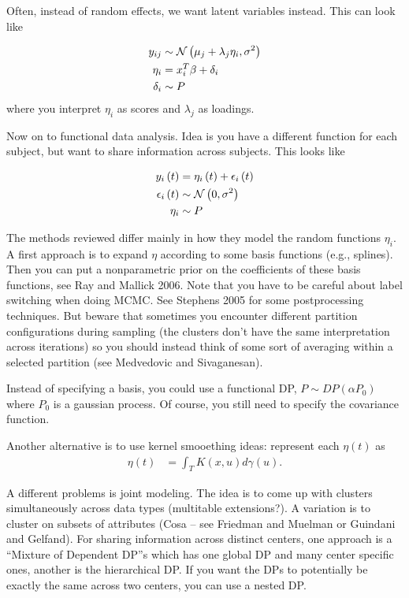 \documentclass{article}
\begin{document}
Often, instead of random effects, we want latent variables instead. This can
look like

\begin{align}
  y_{ij} &\sim \mathcal{N}\left(\mu_{j} + \lambda_{j} \eta_{i}, \sigma^{2}\right) \\
  \eta_{i} &= x_{i}^{T}\beta + \delta_{i} \\
  \delta_{i} &\sim P
\end{align}
where you interpret $\eta_{i}$ as scores and $\lambda_{j}$ as loadings.

Now on to functional data analysis. Idea is you have a different function for
each subject, but want to share information across subjects. This looks like

\begin{align}
  y_{i}\left(t\right) &= \eta_{i}\left(t\right) + \epsilon_{i}\left(t\right) \\
  \epsilon_{i}\left(t\right) &\sim \mathcal{N}\left(0, \sigma^{2}\right) \\
  \eta_{i} &\sim P
\end{align}

The methods reviewed differ mainly in how they model the random functions
$\eta_{i}$. A first approach is to expand $\eta$ according to some basis
functions (e.g., splines). Then you can put a nonparametric prior on the
coefficients of these basis functions, see Ray and Mallick 2006. Note that you
have to be careful about label switching when doing MCMC. See Stephens 2005 for
some postprocessing techniques. But beware that sometimes you encounter
different partition configurations during sampling (the clusters don't have the
same interpretation across iterations) so you should instead think of some sort
of averaging within a selected partition (see Medvedovic and Sivaganesan).

Instead of specifying a basis, you could use a functional DP,
$P \sim DP\left(\alpha P_{0}\right)$ where $P_{0}$ is a gaussian process. Of
course, you still need to specify the covariance function.

Another alternative is to use kernel smooething ideas: represent each
$\eta\left(t\right)$ as
\begin{align}
\eta\left(t\right) &= \int_{T} K\left(x, u\right) d\gamma\left(u\right).
\end{align}

A different problems is joint modeling. The idea is to come up with clusters
simultaneously across data types (multitable extensions?). A variation is to
cluster on subsets of attributes (Cosa -- see Friedman and Muelman or Guindani
and Gelfand). For sharing information across distinct centers, one approach is a
``Mixture of Dependent DP''s which has one global DP and many center specific
ones, another is the hierarchical DP. If you want the DPs to potentially be
exactly the same across two centers, you can use a nested DP.
\end{document}
